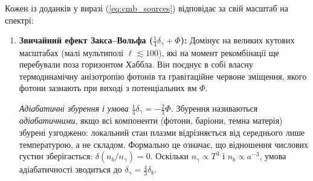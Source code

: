 Кожен із доданків у виразі (\ref{eq:cmb_sources}) відповідає за свій масштаб на спектрі:
\begin{enumerate}
  \item \textbf{Звичайний ефект Закса--Вольфа ($\frac{1}{4}\delta_\gamma + \Phi$):}
        Домінує на великих кутових масштабах (малі мультиполі $\ell \lesssim 100$),
        які на момент рекомбінації ще перебували поза горизонтом Хаббла.
        Він поєднує в собі власну термодинамічну анізотропію фотонів та
        гравітаційне червоне зміщення, якого фотони зазнають при виході
        з потенціальних ям $\Phi$.

        \textit{Адіабатичні збурення і умова $\frac{1}{4}\delta_\gamma = -\frac{2}{3}\Phi$.}
        Збурення називаються \emph{адіабатичними}, якщо всі компоненти
        (фотони, баріони, темна матерія) збурені узгоджено: локальний
        стан плазми відрізняється від середнього лише температурою, а
        не складом. Формально це означає, що відношення числових густин
        зберігається: $\delta(n_b/n_\gamma) = 0$. Оскільки
        $n_\gamma \propto T^3$ і $n_b \propto a^{-3}$, умова адіабатичності
        зводиться до $\delta_\gamma = \frac{4}{3}\delta_b$.


\end{enumerate}
